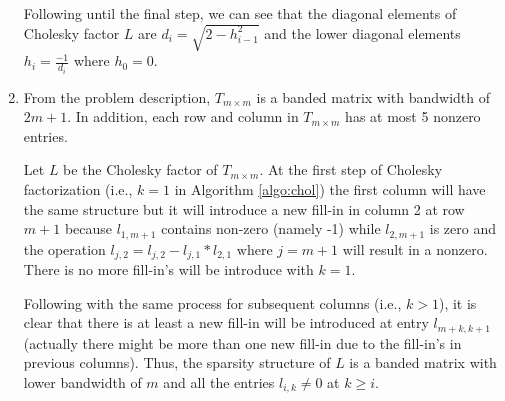 \begin{enumerate}
Following until the final step, we can see that the diagonal elements of Cholesky factor $L$ are $d_{i} = \sqrt{2-h_{i-1}^{2}}$ and the lower diagonal elements $h_{i} = \frac{-1}{d_{i}}$ where $h_{0} = 0$.

\item From the problem description, $T_{m\times m}$ is a banded matrix with bandwidth of $2m+1$. In addition, each row and column in $T_{m\times m}$ has at most 5 nonzero entries. 

Let $L$ be the Cholesky factor of $T_{m\times m}$. At the first step of Cholesky factorization (i.e., $k=1$ in Algorithm \ref{algo:chol}) the first column will have the same structure but it will introduce a new fill-in in column 2 at row $m+1$ because $l_{1,m+1}$ contains non-zero (namely -1) while $l_{2, m+1}$ is zero and the operation $l_{j,2} = l_{j, 2} - l_{j,1}*l_{2,1} \text{\ where\ } j= m+1$ will result in a nonzero. There is no more fill-in's will be introduce with $k=1$. 

Following with the same process for subsequent columns (i.e., $k>1$), it is clear that there is at least a new fill-in will be introduced at entry $l_{m+k,k+1}$ (actually there might be more than one new fill-in due to the fill-in's in previous columns). Thus, the sparsity structure of $L$ is a banded matrix with lower bandwidth of $m$ and all the entries $l_{i,k} \neq 0$ at $k\geq i $.
\end{enumerate}